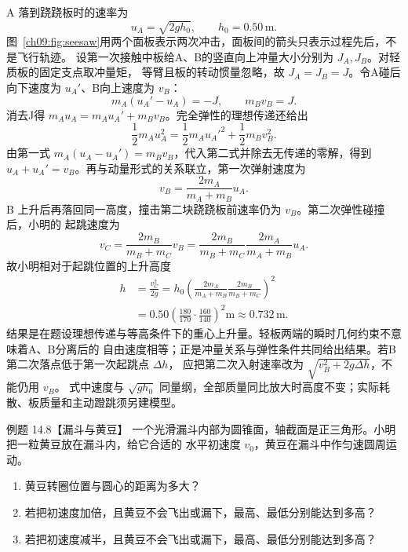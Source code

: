 \begin{xesolution}
A 落到跷跷板时的速率为
\[
 u_A=\sqrt{2gh_0},\qquad h_0=0.50\,\mathrm m.
\]
图~\ref{ch09:fig:seesaw}用两个面板表示两次冲击，面板间的箭头只表示过程先后，不是飞行轨迹。
设第一次接触中板给A、B的竖直向上冲量大小分别为 $J_A,J_B$。对轻质板的固定支点取冲量矩，
等臂且板的转动惯量忽略，故 $J_A=J_B=J$。令A碰后向下速度为 $u_A'$、B向上速度为 $v_B$：
\[
 m_A(u_A'-u_A)=-J,\qquad m_Bv_B=J.
\]
消去J得 $m_Au_A=m_Au_A'+m_Bv_B$。完全弹性的理想传递还给出
\[
 \frac12m_Au_A^2=\frac12m_Au_A'^2+\frac12m_Bv_B^2.
\]
由第一式 $m_A(u_A-u_A')=m_Bv_B$，代入第二式并除去无传递的零解，得到
$u_A+u_A'=v_B$。再与动量形式的关系联立，第一次弹射速度为
\[
 v_B=\frac{2m_A}{m_A+m_B}u_A.
\]
B 上升后再落回同一高度，撞击第二块跷跷板前速率仍为 $v_B$。第二次弹性碰撞后，小明的
起跳速度为
\[
 v_C=\frac{2m_B}{m_B+m_C}v_B
 =\frac{2m_B}{m_B+m_C}\frac{2m_A}{m_A+m_B}u_A.
\]
故小明相对于起跳位置的上升高度
\begin{align*}
 h&=\frac{v_C^2}{2g}
 =h_0\left(
 \frac{2m_A}{m_A+m_B}
 \frac{2m_B}{m_B+m_C}
 \right)^2\\
 &=0.50\left(\frac{180}{170}\cdot\frac{160}{140}\right)^2\mathrm m
 \approx\boxed{0.732\,\mathrm m}.
\end{align*}
结果是在题设理想传递与等高条件下的重心上升量。轻板两端的瞬时几何约束不意味着A、B分离后的
自由速度相等；正是冲量关系与弹性条件共同给出结果。若B第二次落点低于第一次起跳点 $\Delta h$，
应把第二次入射速率改为 $\sqrt{v_B^2+2g\Delta h}$，不能仍用 $v_B$。
式中速度与 $\sqrt{gh_0}$ 同量纲，全部质量同比放大时高度不变；实际耗散、板质量和主动蹬跳须另建模型。
\end{xesolution}

\Needspace{0.44\textheight}
\begin{origexamplebox}{例题 14.8【漏斗与黄豆】}
一个光滑漏斗内部为圆锥面，轴截面是正三角形。小明把一粒黄豆放在漏斗内，给它合适的
水平初速度 $v_0$，黄豆在漏斗中作匀速圆周运动。
\begin{enumerate}[label=(\arabic*),leftmargin=2.2em]
  \item 黄豆转圈位置与圆心的距离为多大？
  \item 若把初速度加倍，且黄豆不会飞出或漏下，最高、最低分别能达到多高？
  \item 若把初速度减半，且黄豆不会飞出或漏下，最高、最低分别能达到多高？
\end{enumerate}
\funnelDiagram
\end{origexamplebox}


